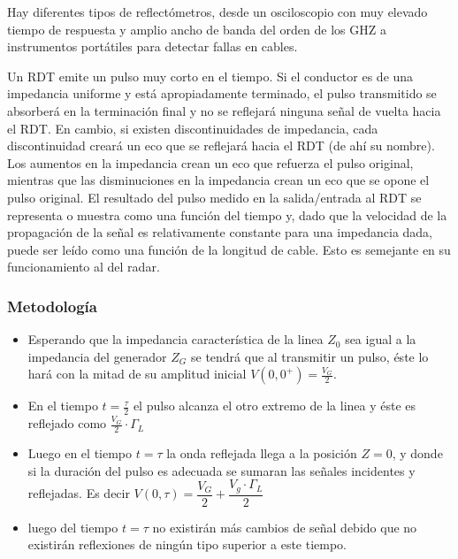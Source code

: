 \documentclass[11pt,onecolumn]{article}
\begin{document}
Hay diferentes tipos de reflectómetros, desde un osciloscopio con muy elevado tiempo de respuesta y amplio ancho de banda del orden de los 
GHZ a instrumentos portátiles para detectar fallas en cables. 

Un RDT emite un pulso muy corto en el tiempo. Si el conductor es de una impedancia uniforme
y está apropiadamente terminado, el pulso transmitido se absorberá en la terminación final
y no se reflejará ninguna señal de vuelta hacia el RDT. En cambio, si existen
discontinuidades de impedancia, cada discontinuidad creará un eco que se reflejará hacia el
RDT (de ahí su nombre). Los aumentos en la impedancia crean un eco que refuerza el pulso
original, mientras que las disminuciones en la impedancia crean un eco que se opone el
pulso original. El resultado del pulso medido en la salida/entrada al RDT se representa o
muestra como una función del tiempo y, dado que la velocidad de la propagación de la señal
es relativamente constante para una impedancia dada, puede ser leído como una función de la
longitud de cable. Esto es semejante en su funcionamiento al del radar.

\subsubsection{Metodología}

\begin{itemize}
\item Esperando que la impedancia característica de la linea $Z_{0}$ sea igual a la impedancia del generador $Z_{G}$ se tendrá que al transmitir un pulso, éste lo hará con la mitad de su amplitud inicial $ V(0,0^{+}) = \frac{V_{G}}{2}$. 

\item En el tiempo $t = \frac{\tau}{2}$ el pulso alcanza el otro extremo de la linea y éste es reflejado como $\frac{V_{G}}{2} \cdot \Gamma_{L}$


\item Luego en el tiempo $t = \tau$ la onda reflejada llega a la posición $Z = 0$, y donde si la duración del pulso es adecuada se sumaran las señales incidentes y reflejadas. Es decir $V(0,\tau) = \dfrac{V_{G}}{2} + \dfrac{V_{g}\cdot \Gamma_{L}}{2}$ 

\item luego del tiempo $t = \tau$ no existirán más cambios de señal debido que no existirán reflexiones de ningún tipo superior a este tiempo.

\end{itemize}
\end{document}
